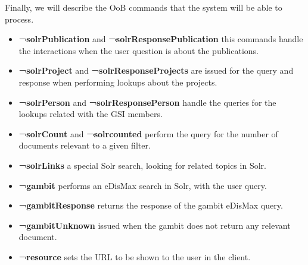 Finally, we will describe the \ac{OoB} commands that the system will be able to process.

\begin{itemize}
 \item \textbf{¬solrPublication} and \textbf{¬solrResponsePublication} this commands handle the interactions when the user question is about the publications.
 \item \textbf{¬solrProject} and \textbf{¬solrResponseProjects} are issued for the query and response when performing lookups about the projects.
 \item \textbf{¬solrPerson} and \textbf{¬solrResponsePerson} handle the queries for the lookups related with the GSI members.
 \item \textbf{¬solrCount} and \textbf{¬solrcounted} perform the query for the number of documents relevant to a given filter.
 \item \textbf{¬solrLinks} a special Solr search, looking for related topics in Solr. 
 \item \textbf{¬gambit} performs an \ac{eDisMax} search in Solr, with the user query.
 \item \textbf{¬gambitResponse} returns the response of the gambit \ac{eDisMax} query.
 \item \textbf{¬gambitUnknown} issued when the gambit does not return any relevant document.
 \item \textbf{¬resource} sets the URL to be shown to the user in the client.
\end{itemize}

